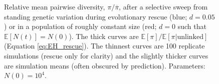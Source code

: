 \documentclass[]{article}
\begin{document}
\begin{figure}[htb]
\caption{
Relative mean pairwise diversity, $\pi/\overline{\pi}$, after a selective sweep from standing genetic variation during evolutionary rescue (blue; $d=0.05$) or in a population of roughly constant size (red; $d=0$ such that $\mathbb{E}[N(t)]=N(0)$).
The thick curves are $\mathbb{E}[\pi]/\mathbb{E}[\pi|\mathrm{unlinked}]$ (Equation \ref{eq:EH_rescue}).
The thinnest curves are 100 replicate simulations (rescue only for clarity) and the slightly thicker curves are simulation means (often obscured by prediction).
Parameters: $N(0)=10^4$.
}%
\label{fig:rescueSGV_heterozygosity_relative}
\end{figure}
\end{document}
